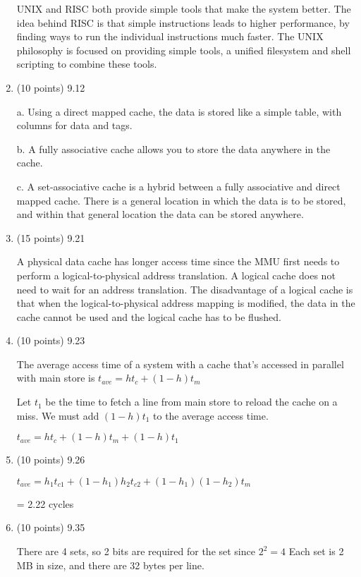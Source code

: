 \documentclass[letterpaper,10pt,onecolumn,titlepage]{article}
\begin{document}
\begin{enumerate}
  UNIX and RISC both provide simple tools that make the system better.
  The idea behind RISC is that simple instructions leads to higher performance, by finding ways to run the individual instructions much faster.
  The UNIX philosophy is focused on providing simple tools, a unified filesystem and shell scripting to combine these tools.

\item (10 points) 9.12

  a.  Using a direct mapped cache, the data is stored like a simple table, with columns for data and tags.
  
  b.  A fully associative cache allows you to store the data anywhere in the cache.
  
  c.  A set-associative cache is a hybrid between a fully associative and direct mapped cache.
  There is a general location in which the data is to be stored, and within that general location the data can be stored anywhere.

\item (15 points) 9.21

  A physical data cache has longer access time since the MMU first needs to perform a logical-to-physical address translation.
  A logical cache does not need to wait for an address translation.
  The disadvantage of a logical cache is that when the logical-to-physical address mapping is modified, the data in the cache cannot be used and the logical cache has to be flushed.

\item (10 points) 9.23

  The average access time of a system with a cache that's accessed in parallel with main store is $t_{ave} = ht_{c} + (1-h)t_{m}$
  
  Let $t_{1}$ be the time to fetch a line from main store to reload the cache on a miss.  We must add $(1-h)t_{1}$ to the average access time.
  
  $t_{ave} = ht_{c} + (1-h)t_{m} + (1-h)t_{1}$

\item (10 points) 9.26

  $t_{ave} = h_{1}t_{c1} + (1 - h_{1})h_{2}t_{c2} + (1 - h_{1})(1 - h_{2})t_{m}$
  
  = 2.22 cycles

\item (10 points) 9.35

  There are 4 sets, so 2 bits are required for the set since $2^2 = 4$
  \newline
  Each set is 2 MB in size, and there are 32 bytes per line.
  

\end{enumerate}
\end{document}
